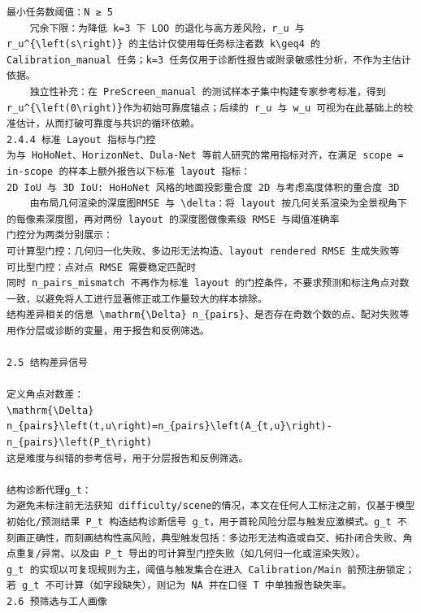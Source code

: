 \documentclass[a4paper,12pt]{article}
\begin{document}
\begin{Verbatim}[fontsize=\small,breaklines=true,breakanywhere=true]
最小任务数阈值：N ≥ 5
	冗余下限：为降低 k=3 下 LOO 的退化与高方差风险，r_u 与 r_u^{\left(s\right)} 的主估计仅使用每任务标注者数 k\geq4 的 Calibration_manual 任务；k=3 任务仅用于诊断性报告或附录敏感性分析，不作为主估计依据。
	独立性补充：在 PreScreen_manual 的测试样本子集中构建专家参考标准，得到 r_u^{\left(0\right)}作为初始可靠度锚点；后续的 r_u 与 w_u 可视为在此基础上的校准估计，从而打破可靠度与共识的循环依赖。
2.4.4 标准 Layout 指标与门控
为与 HoHoNet、HorizonNet、Dula-Net 等前人研究的常用指标对齐，在满足 scope = in-scope 的样本上额外报告以下标准 layout 指标：
2D IoU 与 3D IoU: HoHoNet 风格的地面投影重合度 2D 与考虑高度体积的重合度 3D
	由布局几何渲染的深度图RMSE 与 \delta：将 layout 按几何关系渲染为全景视角下的每像素深度图，再对两份 layout 的深度图做像素级 RMSE 与阈值准确率
门控分为两类分别展示：
可计算型门控：几何归一化失败、多边形无法构造、layout rendered RMSE 生成失败等
可比型门控：点对点 RMSE 需要稳定匹配时
同时 n_pairs_mismatch 不再作为标准 layout 的门控条件，不要求预测和标注角点对数一致，以避免将人工进行显著修正或工作量较大的样本排除。
结构差异相关的信息 \mathrm{\Delta} n_{pairs}、是否存在奇数个数的点、配对失败等用作分层或诊断的变量，用于报告和反例筛选。

2.5 结构差异信号

定义角点对数差：
\mathrm{\Delta} n_{pairs}\left(t,u\right)=n_{pairs}\left(A_{t,u}\right)-n_{pairs}\left(P_t\right)
这是难度与纠错的参考信号，用于分层报告和反例筛选。

结构诊断代理g_t：
为避免未标注前无法获知 difficulty/scene的情况，本文在任何人工标注之前，仅基于模型初始化/预测结果 P_t 构造结构诊断信号 g_t，用于首轮风险分层与触发应激模式。g_t 不刻画正确性，而刻画结构性高风险，典型触发包括：多边形无法构造或自交、拓扑闭合失败、角点重复/异常、以及由 P_t 导出的可计算型门控失败（如几何归一化或渲染失败）。
g_t 的实现以可复现规则为主，阈值与触发集合在进入 Calibration/Main 前预注册锁定；若 g_t 不可计算（如字段缺失），则记为 NA 并在口径 T 中单独报告缺失率。
2.6 预筛选与工人画像


\end{Verbatim}
\end{document}
